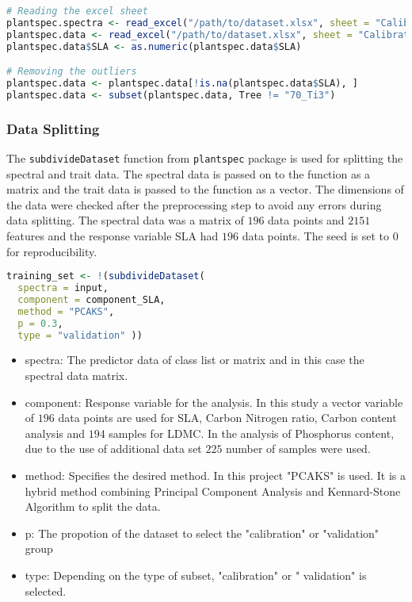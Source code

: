 \documentclass[12pt,a4paper]{report}
\begin{document}
\begin{lstlisting}[language=R, style=mystyle]
# Reading the excel sheet
plantspec.spectra <- read_excel("/path/to/dataset.xlsx", sheet = "Calibration set spectra")
plantspec.data <- read_excel("/path/to/dataset.xlsx", sheet = "Calibration set traits")
plantspec.data$SLA <- as.numeric(plantspec.data$SLA)

# Removing the outliers
plantspec.data <- plantspec.data[!is.na(plantspec.data$SLA), ]
plantspec.data <- subset(plantspec.data, Tree != "70_Ti3")
\end{lstlisting}

\subsubsection*{Data Splitting}
The \texttt{subdivideDataset} function from \texttt{plantspec} package is used for splitting the spectral and trait data. The spectral data is passed on to the function as a matrix and the trait data is passed to the function as a vector. The dimensions of the data were checked after the preprocessing step to avoid any errors during data splitting. The spectral data was a matrix of $196$ data points and $2151$ features and the response variable SLA had $196$ data points. The seed is set to $0$ for reproducibility. \\

\begin{lstlisting}[language=R, style=mystyle]
training_set <- !(subdivideDataset(
  spectra = input,
  component = component_SLA,
  method = "PCAKS", 
  p = 0.3, 
  type = "validation" ))
\end{lstlisting}


\begin{itemize}
    \item spectra: The predictor data of class list or matrix and in this case the spectral data matrix.
    \item component: Response variable for the analysis. In this study a vector variable of $196$ data points are used for SLA, Carbon Nitrogen ratio, Carbon content analysis and $194$ samples for LDMC. In the analysis of Phosphorus content, due to the use of additional data set $225$ number of samples were used.
    \item method: Specifies the desired method. In this project "PCAKS" is used. It is a hybrid method combining Principal Component Analysis and Kennard-Stone Algorithm to split the data.
    \item p: The propotion of the dataset to select the "calibration" or "validation" group
    \item type: Depending on the type of subset, "calibration" or " validation" is selected.
\end{itemize}
\end{document}
